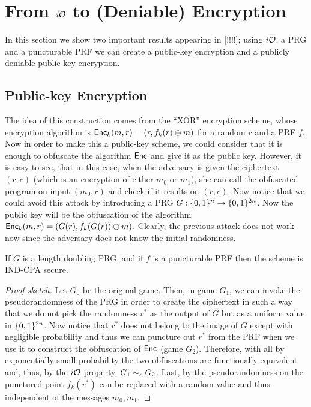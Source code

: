 \section{From $i\mathcal{O}$ to (Deniable) Encryption}
In this section we show two important results appearing in [!!!!]; using $i\mathcal{O}$, a PRG and a puncturable PRF we can create a public-key encryption and a publicly deniable public-key encryption.

\subsection{Public-key Encryption}
The idea of this construction comes from the ``XOR'' encryption scheme, whose encryption algorithm is $\mathsf{Enc}_k(m,r)=(r,f_k(r)\oplus m)$ for a random $r$ and a PRF $f$. Now in order to make this a public-key scheme, we could consider that it is enough to obfuscate the algorithm $\mathsf{Enc}$ and give it as the public key. However, it is easy to see, that in this case, when the adversary is given the ciphertext $(r,c)$ (which is an encryption of either $m_0$ or $m_1$), she can call the obfuscated program on input $(m_0,r)$ and check if it results on $(r,c)$. Now notice that we could avoid this attack by introducing a PRG $G:\{0,1\}^n\to\{0,1\}^{2n}$. Now the public key will be the obfuscation of the algorithm $\mathsf{Enc}_k(m,r)=(G(r),f_k(G(r))\oplus m)$. Clearly, the previous attack does not work now since the adversary does not know the initial randomness.

\begin{mytheorem}
If $G$ is a length doubling PRG, and if $f$ is a puncturable PRF then the scheme is IND-CPA secure.
\end{mytheorem}
\begin{proof}[Proof sketch]
Let $G_0$ be the original game. Then, in game $G_1$, we can invoke the pseudorandomness of the PRG in order to create the ciphertext in such a way that we do not pick the randomness $r^*$ as the output of $G$ but as a uniform value in $\{0,1\}^{2n}$. Now notice that $r^*$ does not belong to the image of $G$ except with negligible probability and thus we can puncture out $r^*$ from the PRF when we use it to construct the obfuscation of $\mathsf{Enc}$ (game $G_2$). Therefore, with all by exponentially small probability the two obfuscations are functionally equivalent and, thus, by the $i\mathcal{O}$ property, $G_1\sim_c G_2$. Last, by the pseudorandomness on the punctured point $f_k(r^*)$ can be replaced with a random value and thus independent of the messages $m_0,m_1$. 
\end{proof}

